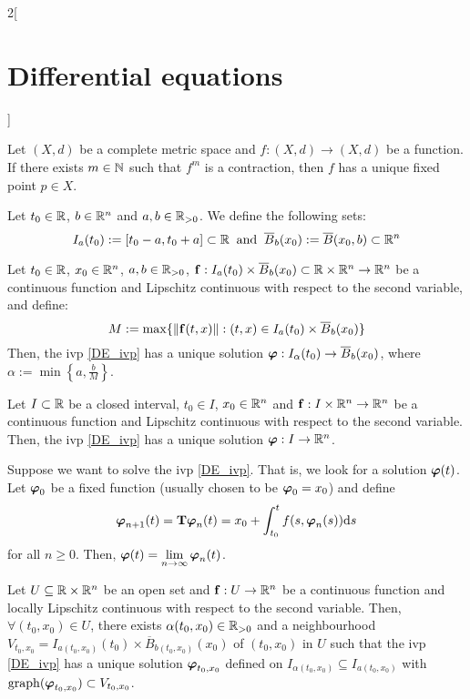 \documentclass[../../../main.tex]{subfiles}
\begin{document}
\begin{multicols}{2}[\section{Differential equations}]
\begin{corollary}
    Let $(X,d)$ be a complete metric space and $f:(X,d)\rightarrow (X,d)$ be a function. If there exists $m\in\mathbb{N}$ such that $f^m$ is a contraction, then $f$ has a unique fixed point $p\in X$.
  \end{corollary}
  \begin{definition}
    Let $t_0\in\mathbb{R}$, $b\in\mathbb{R}^n$ and $a,b\in\mathbb{R}_{>0}$. We define the following sets: $$I_a(t_0):=[t_0-a,t_0+a]\subset\mathbb{R}\;\;\text{and}\;\;\overline{B}_{b}(x_0):=\overline{B}(x_0,b)\subset\mathbb{R}^n$$
  \end{definition}
  \begin{theorem}\label{DE_picard}
    Let $t_0\in\mathbb{R}$, $x_0\in\mathbb{R}^n$, $a,b\in\mathbb{R}_{>0}$, $\boldsymbol{\mathrm{f}}:I_a(t_0)\times\overline{B}_{b}(x_0)\subset\mathbb{R}\times\mathbb{R}^n\rightarrow\mathbb{R}^n$ be a continuous function and Lipschitz continuous with respect to the second variable, and define: $$M:=\max\{\|\boldsymbol{\mathrm{f}}(t,x)\|:(t,x)\in I_a(t_0)\times\overline{B}_{b}(x_0)\}$$ Then, the ivp \eqref{DE_ivp} has a unique solution $\boldsymbol{\mathrm{\varphi}}:I_\alpha(t_0)\rightarrow\overline{B}_{b}(x_0)$, where $\alpha:=\min\left\{a,\frac{b}{M}\right\}$.
  \end{theorem}
  \begin{corollary}
    Let $I\subset \mathbb{R}$ be a closed interval, $t_0\in I$, $x_0\in\mathbb{R}^n$ and $\boldsymbol{\mathrm{f}}:I\times\mathbb{R}^n\rightarrow\mathbb{R}^n$ be a continuous function and Lipschitz continuous with respect to the second variable. Then, the ivp \eqref{DE_ivp} has a unique solution $\boldsymbol{\mathrm{\varphi}}:I\rightarrow\mathbb{R}^n$.
  \end{corollary}
  \begin{corollary}
    Suppose we want to solve the ivp \eqref{DE_ivp}. That is, we look for a solution $\boldsymbol{\mathrm{\varphi}}(t)$. Let $\boldsymbol{\mathrm{\varphi}}_0$ be a fixed function (usually chosen to be $\boldsymbol{\mathrm{\varphi}}_0=x_0$) and define
    $$\boldsymbol{\mathrm{\varphi}}_{n+1}(t)=\boldsymbol{\mathrm{T}}\boldsymbol{\mathrm{\varphi}}_n(t)=x_0+\int_{t_0}^tf(s,\boldsymbol{\mathrm{\varphi}}_n(s))\dd s$$
    for all $n\geq 0$. Then, $\displaystyle\boldsymbol{\mathrm{\varphi}}(t)=\lim_{n\to\infty}\boldsymbol{\mathrm{\varphi}}_n(t)$.
  \end{corollary}
  \begin{corollary}
    Let $U\subseteq\mathbb{R}\times\mathbb{R}^n$ be an open set and $\boldsymbol{\mathrm{f}}:U\rightarrow\mathbb{R}^n$ be a continuous function and locally Lipschitz continuous with respect to the second variable. Then, $\forall(t_0,x_0)\in U$, there exists $\alpha(t_0,x_0)\in\mathbb{R}_{>0}$ and a neighbourhood $V_{t_0,x_0}=I_{a(t_0,x_0)}(t_0)\times\overline{B}_{b(t_0,x_0)}(x_0)$ of $(t_0,x_0)$ in $U$ such that the ivp \eqref{DE_ivp} has a unique solution $\boldsymbol{\mathrm{\varphi}}_{t_0,x_0}$ defined on $I_{\alpha(t_0,x_0)}\subseteq I_{a(t_0,x_0)}$ with $\operatorname{graph}(\boldsymbol{\mathrm{\varphi}}_{t_0,x_0})\subset V_{t_0,x_0}$.

\end{corollary}
\end{multicols}
\end{document}
